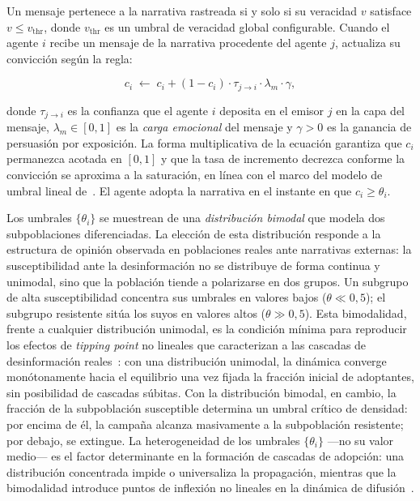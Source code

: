 Un mensaje pertenece a la narrativa rastreada si y solo si su veracidad $v$ satisface $v \leq v_{\text{thr}}$, donde $v_{\text{thr}}$ es un umbral de veracidad global configurable. Cuando el agente $i$ recibe un mensaje de la narrativa procedente del agente $j$, actualiza su convicción según la regla:

\begin{equation}
  c_i \;\leftarrow\; c_i + (1 - c_i)\cdot\tau_{j \to i}\cdot\lambda_m\cdot\gamma,
  \label{eq:conviction}
\end{equation}

donde $\tau_{j \to i}$ es la confianza que el agente $i$ deposita en el emisor $j$ en la capa del mensaje, $\lambda_m \in [0,1]$ es la \emph{carga emocional} del mensaje y $\gamma > 0$ es la ganancia de persuasión por exposición. La forma multiplicativa de la ecuación garantiza que $c_i$ permanezca acotada en $[0,1]$ y que la tasa de incremento decrezca conforme la convicción se aproxima a la saturación, en línea con el marco del modelo de umbral lineal de~\cite{KempeKleinbergTardos2003}. El agente adopta la narrativa en el instante en que $c_i \geq \theta_i$.

Los umbrales $\{\theta_i\}$ se muestrean de una \emph{distribución bimodal} que modela dos subpoblaciones diferenciadas. La elección de esta distribución responde a la estructura de opinión observada en poblaciones reales ante narrativas externas: la susceptibilidad ante la desinformación no se distribuye de forma continua y unimodal, sino que la población tiende a polarizarse en dos grupos. Un subgrupo de alta susceptibilidad concentra sus umbrales en valores bajos ($\theta \ll 0{,}5$); el subgrupo resistente sitúa los suyos en valores altos ($\theta \gg 0{,}5$). Esta bimodalidad, frente a cualquier distribución unimodal, es la condición mínima para reproducir los efectos de \emph{tipping point} no lineales que caracterizan a las cascadas de desinformación reales~\cite{Granovetter1978}: con una distribución unimodal, la dinámica converge monótonamente hacia el equilibrio una vez fijada la fracción inicial de adoptantes, sin posibilidad de cascadas súbitas. Con la distribución bimodal, en cambio, la fracción de la subpoblación susceptible determina un umbral crítico de densidad: por encima de él, la campaña alcanza masivamente a la subpoblación resistente; por debajo, se extingue. La heterogeneidad de los umbrales $\{\theta_i\}$ ---no su valor medio--- es el factor determinante en la formación de cascadas de adopción: una distribución concentrada impide o universaliza la propagación, mientras que la bimodalidad introduce puntos de inflexión no lineales en la dinámica de difusión~\cite{Granovetter1978,Watts2002}.

